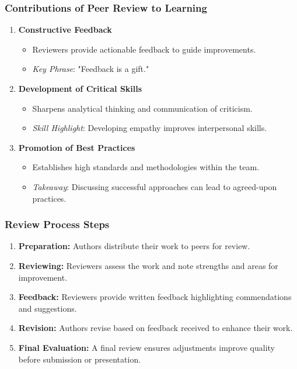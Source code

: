 \documentclass{beamer}
\begin{document}
\begin{frame}[fragile]
    \frametitle{Contributions of Peer Review to Learning}
    \begin{enumerate}
        \item \textbf{Constructive Feedback}
        \begin{itemize}
            \item Reviewers provide actionable feedback to guide improvements.
            \item \textit{Key Phrase}: "Feedback is a gift."
        \end{itemize}

        \item \textbf{Development of Critical Skills}
        \begin{itemize}
            \item Sharpens analytical thinking and communication of criticism.
            \item \textit{Skill Highlight}: Developing empathy improves interpersonal skills.
        \end{itemize}

        \item \textbf{Promotion of Best Practices}
        \begin{itemize}
            \item Establishes high standards and methodologies within the team.
            \item \textit{Takeaway}: Discussing successful approaches can lead to agreed-upon practices.
        \end{itemize}
    \end{enumerate}
\end{frame}

\begin{frame}[fragile]
    \frametitle{Review Process Steps}
    \begin{enumerate}
        \item \textbf{Preparation:} Authors distribute their work to peers for review.
        \item \textbf{Reviewing:} Reviewers assess the work and note strengths and areas for improvement.
        \item \textbf{Feedback:} Reviewers provide written feedback highlighting commendations and suggestions.
        \item \textbf{Revision:} Authors revise based on feedback received to enhance their work.
        \item \textbf{Final Evaluation:} A final review ensures adjustments improve quality before submission or presentation.
    \end{enumerate}
\end{frame}
\end{document}
